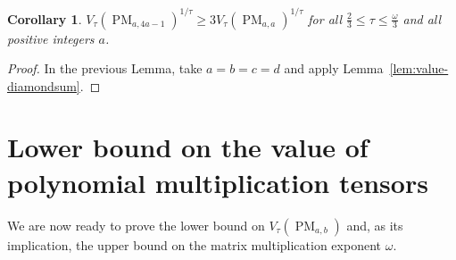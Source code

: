 \documentclass[11pt,letterpaper]{article}
\newtheorem{corollary}[theorem]{Corollary}\AddToHook{env/corollary/begin}{\crefalias{theorem}{corollary}}
\numberwithin{equation}{section}
\DeclareMathOperator{\PM}{PM}
\begin{document}
\begin{corollary}\label{cor:pm-tripling}
    $V_\tau(\PM_{a,4a - 1})^{1/\tau} \geq 3 V_\tau(\PM_{a,a})^{1/\tau}$ for all $\frac23 \leq \tau \leq \frac{\omega}{3}$ and all positive integers $a$.
\end{corollary}
\begin{proof}
    In the previous Lemma, take $a = b = c = d$ and apply Lemma~\ref{lem:value-diamondsum}.
\end{proof}

\section{Lower bound on the value of polynomial multiplication tensors}
\label{sec:lower-bound}
We are now ready to prove the lower bound on $V_\tau(\PM_{a,b})$ and, as its implication, the upper bound on the matrix
multiplication exponent $\omega$.
\end{document}
